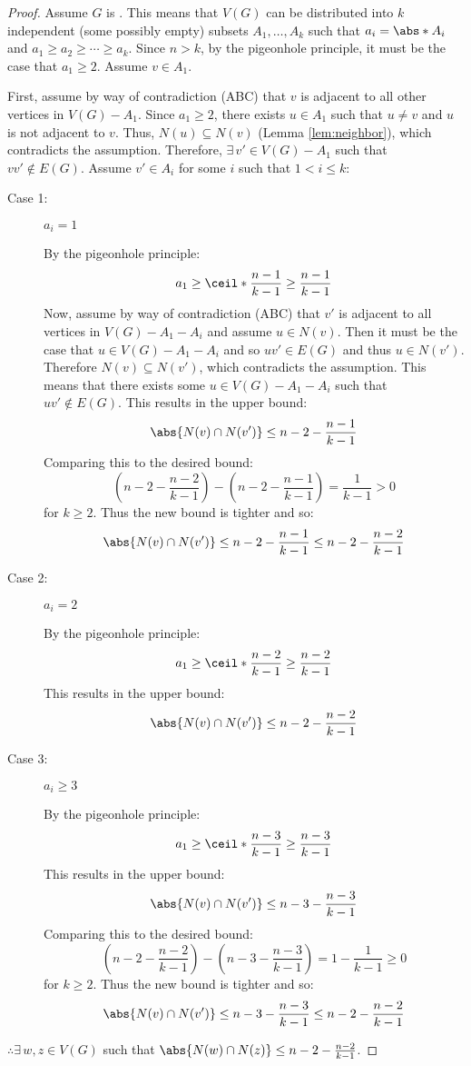 \begin{proof}
  Assume \(G\) is .  This means that \(V(G)\) can be distributed into \(k\) independent (some possibly empty)
  subsets \(A_1,\ldots,A_k\) such that \(a_i=\abs*{A_i}\) and \(a_1\ge a_2\ge\cdots\ge a_k\).  Since \(n>k\), by the pigeonhole
  principle, it must be the case that \(a_1\ge2\).  Assume \(v\in A_1\).

  First, assume by way of contradiction (ABC) that \(v\) is adjacent to all other vertices in \(V(G)-A_1\).  Since \(a_1\ge2\),
  there exists \(u\in A_1\) such that \(u\ne v\) and \(u\) is not adjacent to \(v\).  Thus, \(N(u)\subseteq N(v)\) (Lemma
  \ref{lem:neighbor}), which contradicts the assumption.  Therefore, \(\exists\,v'\in V(G)-A_1\) such that \(vv'\notin E(G)\).
  Assume \(v'\in A_i\) for some \(i\) such that \(1<i\le k\):

  \begin{description}
  \item [Case 1:] \(a_i=1\)

    By the pigeonhole principle:
    \[a_1\ge\ceil*{\frac{n-1}{k-1}}\ge\frac{n-1}{k-1}\]
    Now, assume by way of contradiction (ABC) that \(v'\) is adjacent to all vertices in \(V(G)-A_1-A_i\) and assume
    \(u\in N(v)\).  Then it must be the case that \(u\in V(G)-A_1-A_i\) and so \(uv'\in E(G)\) and thus \(u\in N(v')\).
    Therefore \(N(v)\subseteq N(v')\), which contradicts the assumption.  This means that there exists some
    \(u\in V(G)-A_1-A_i\) such that \(uv'\notin E(G)\).  This results in the upper bound:
    \[\abs{N(v)\cap N(v')}\le n-2-\frac{n-1}{k-1}\]
    Comparing this to the desired bound:
    \[\left(n-2-\frac{n-2}{k-1}\right)-\left(n-2-\frac{n-1}{k-1}\right)=\frac{1}{k-1}>0\]
    for \(k\ge2\).  Thus the new bound is tighter and so:
    \[\abs{N(v)\cap N(v')}\le n-2-\frac{n-1}{k-1}\le n-2-\frac{n-2}{k-1}\]
    
  \item [Case 2:] \(a_i=2\)

    By the pigeonhole principle:
    \[a_1\ge\ceil*{\frac{n-2}{k-1}}\ge\frac{n-2}{k-1}\]
    This results in the upper bound:
    \[\abs{N(v)\cap N(v')}\le n-2-\frac{n-2}{k-1}\]
    
  \item [Case 3:] \(a_i\ge3\)

    By the pigeonhole principle:
    \[a_1\ge\ceil*{\frac{n-3}{k-1}}\ge\frac{n-3}{k-1}\]
    This results in the upper bound:
    \[\abs{N(v)\cap N(v')}\le n-3-\frac{n-3}{k-1}\]
    Comparing this to the desired bound:
    \[\left(n-2-\frac{n-2}{k-1}\right)-\left(n-3-\frac{n-3}{k-1}\right)=1-\frac{1}{k-1}\ge0\]
    for \(k\ge2\).  Thus the new bound is tighter and so:
    \[\abs{N(v)\cap N(v')}\le n-3-\frac{n-3}{k-1}\le n-2-\frac{n-2}{k-1}\]
  \end{description}

  \(\displaystyle \therefore\exists\,w,z\in V(G)\) such that \(\abs{N(w)\cap N(z)}\le n-2-\frac{n-2}{k-1}\).
\end{proof}

